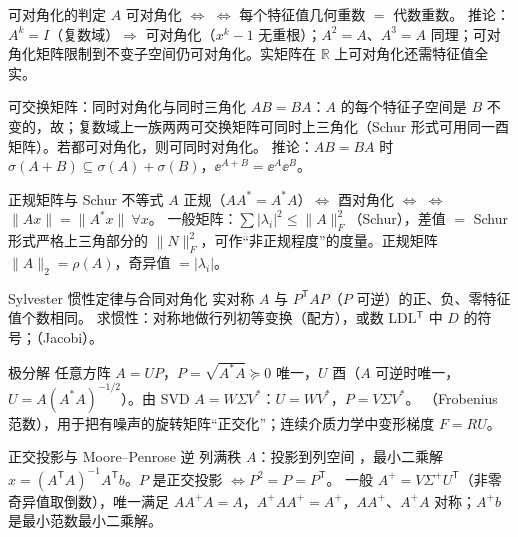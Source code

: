 \begin{结论}{可对角化的判定}
$A$ 可对角化 $\iff$  $\iff$ 每个特征值几何重数 $=$ 代数重数。
推论：$A^k=I$（复数域）$\Rightarrow$ 可对角化（$x^k-1$ 无重根）；$A^2=A$、$A^3=A$ 同理；可对角化矩阵限制到不变子空间仍可对角化。实矩阵在 $\mathbb R$ 上可对角化还需特征值全实。
\end{结论}

\begin{结论}{可交换矩阵：同时对角化与同时三角化}
$AB=BA$：$A$ 的每个特征子空间是 $B$ 不变的，故；复数域上一族两两可交换矩阵可同时上三角化（Schur 形式可用同一酉矩阵）。若都可对角化，则可同时对角化。
推论：$AB=BA$ 时 $\sigma(A+B)\subseteq\sigma(A)+\sigma(B)$，$\ee^{A+B}=\ee^A\ee^B$。
\end{结论}

\begin{结论}{正规矩阵与 Schur 不等式}
$A$ 正规（$AA^*=A^*A$）$\iff$ 酉对角化 $\iff$  $\iff$ $\|Ax\|=\|A^*x\|\ \forall x$。
一般矩阵：$\sum|\lambda_i|^2\le\|A\|_F^2$（Schur），差值 $=$ Schur 形式严格上三角部分的 $\|N\|_F^2$，可作“非正规程度”的度量。正规矩阵 $\|A\|_2=\rho(A)$，奇异值 $=|\lambda_i|$。
\end{结论}

\begin{结论}{Sylvester 惯性定律与合同对角化}
实对称 $A$ 与 $P^{\mathsf T}AP$（$P$ 可逆）的正、负、零特征值个数相同。
求惯性：对称地做行列初等变换（配方），或数 LDL$^{\mathsf T}$ 中 $D$ 的符号；（Jacobi）。
\end{结论}

\begin{结论}{极分解}
任意方阵 $A=UP$，$P=\sqrt{A^*A}\succeq0$ 唯一，$U$ 酉（$A$ 可逆时唯一，$U=A(A^*A)^{-1/2}$）。由 SVD $A=W\Sigma V^*$：$U=WV^*$，$P=V\Sigma V^*$。
（Frobenius 范数），用于把有噪声的旋转矩阵“正交化”；连续介质力学中变形梯度 $F=RU$。
\end{结论}

\begin{结论}{正交投影与 Moore--Penrose 逆}
列满秩 $A$：投影到列空间 ，最小二乘解 $\hat x=(A^{\mathsf T}A)^{-1}A^{\mathsf T}b$。$P$ 是正交投影 $\iff P^2=P=P^{\mathsf T}$。
一般 $A^+=V\Sigma^+U^{\mathsf T}$（非零奇异值取倒数），唯一满足 $AA^+A=A$，$A^+AA^+=A^+$，$AA^+$、$A^+A$ 对称；$A^+b$ 是最小范数最小二乘解。
\end{结论}

